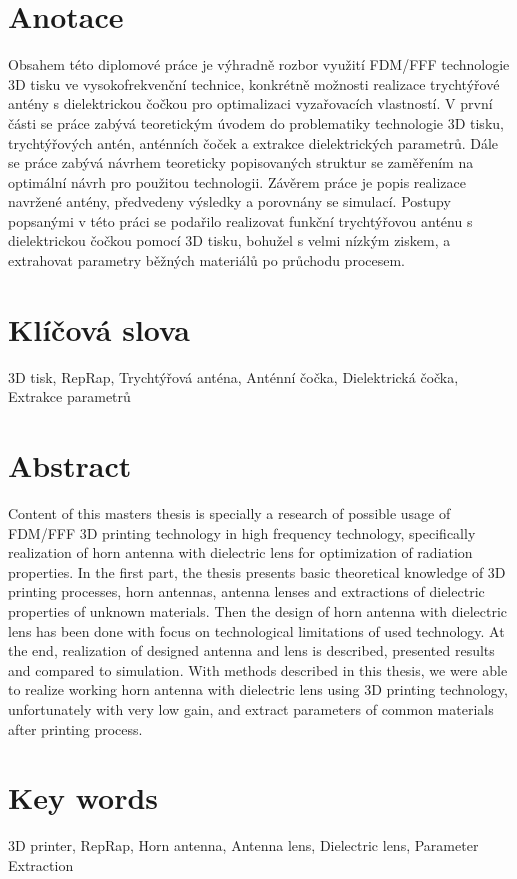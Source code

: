 % 
% 
%

\section*{Anotace}

Obsahem této diplomové práce je výhradně rozbor využití FDM/FFF technologie 3D tisku ve vysokofrekvenční technice, konkrétně možnosti realizace trychtýřové antény s dielektrickou čočkou pro optimalizaci vyzařovacích vlastností. V první části se práce zabývá teoretickým úvodem do problematiky technologie 3D tisku, trychtýřových antén, anténních čoček a extrakce dielektrických parametrů. Dále se práce zabývá návrhem teoreticky popisovaných struktur se zaměřením na optimální návrh pro použitou technologii. Závěrem práce je popis realizace navržené antény, předvedeny výsledky a porovnány se simulací.
Postupy popsanými v této práci se podařilo realizovat funkční trychtýřovou anténu s dielektrickou čočkou pomocí 3D tisku, bohužel s velmi nízkým ziskem, a extrahovat parametry běžných materiálů po průchodu procesem.


\section*{Klíčová slova}

3D tisk, RepRap, Trychtýřová anténa, Anténní čočka, Dielektrická čočka, Extrakce parametrů

\section*{Abstract}

Content of this masters thesis is specially a research of possible usage of FDM/FFF 3D printing technology in high frequency technology, specifically realization of horn antenna with dielectric lens for optimization of radiation properties. In the first part, the thesis presents basic theoretical knowledge of 3D printing processes, horn antennas, antenna lenses and extractions of dielectric properties of unknown materials. Then the design of horn antenna with dielectric lens has been done with focus on technological limitations of used technology. At the end, realization of designed antenna and lens is described, presented results and compared to simulation.
With methods described in this thesis, we were able to realize working horn antenna with dielectric lens using 3D printing technology, unfortunately with very low gain, and extract parameters of common materials after printing process.


\section*{Key words}

3D printer, RepRap, Horn antenna, Antenna lens, Dielectric lens, Parameter Extraction